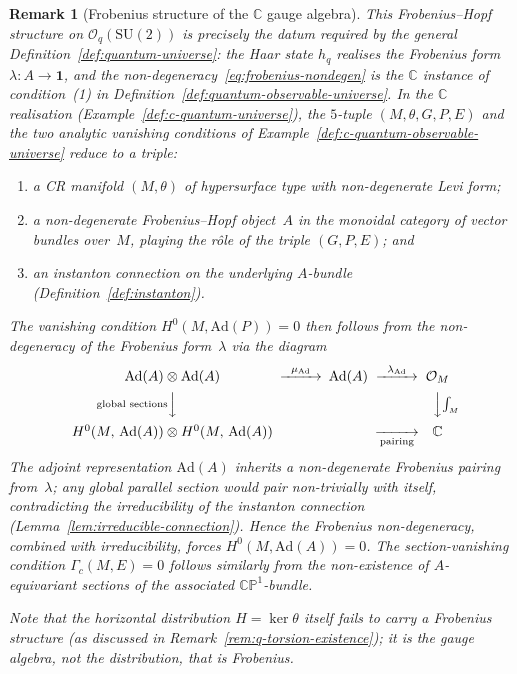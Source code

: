 \documentclass[12pt,a4paper]{report}
\newtheorem{remark}[theorem]{Remark}
\begin{document}
\begin{remark}[Frobenius structure of the $\mathbb{C}$ gauge algebra]
This Frobenius--Hopf structure on $\mathcal{O}_q(\mathrm{SU}(2))$ is
precisely the datum required by the general
Definition~\ref{def:quantum-universe}: the Haar state $h_q$ realises
the Frobenius form $\lambda \colon A \to \mathbf{1}$, and the
non-degeneracy~\eqref{eq:frobenius-nondegen} is the $\mathbb{C}$
instance of condition~(1) in
Definition~\ref{def:quantum-observable-universe}.
In the $\mathbb{C}$ realisation (Example~\ref{def:c-quantum-universe}),
the $5$-tuple $(M, \theta, G, P, E)$ and the two analytic vanishing
conditions of Example~\ref{def:c-quantum-observable-universe}
reduce to a triple:
\begin{enumerate}
  \item a CR manifold $(M, \theta)$ of hypersurface type with
        non-degenerate Levi form;
  \item a non-degenerate Frobenius--Hopf object~$A$ in the monoidal
        category of vector bundles over~$M$, playing the r\^ole of the
        triple $(G, P, E)$; and
  \item an instanton connection on the underlying $A$-bundle
        (Definition~\ref{def:instanton}).
\end{enumerate}
The vanishing condition $H^0(M, \mathrm{Ad}(P)) = 0$ then follows from
the non-degeneracy of the Frobenius form~$\lambda$ via the diagram
\begin{equation}\label{eq:frobenius-vanishing}
\begin{CD}
\mathrm{Ad}(A) \otimes \mathrm{Ad}(A)
  @>{\mu_{\mathrm{Ad}}}>>
  \mathrm{Ad}(A)
  @>{\lambda_{\mathrm{Ad}}}>>
  \mathcal{O}_M \\
@V{\text{global sections}}VV  @.  @VV{\int_M}V \\
H^0(M,\,\mathrm{Ad}(A)) \otimes H^0(M,\,\mathrm{Ad}(A))
  @.  @>>{\text{pairing}}>
  \mathbb{C}
\end{CD}
\end{equation}
The adjoint representation $\mathrm{Ad}(A)$ inherits a non-degenerate
Frobenius pairing from~$\lambda$; any global parallel section would
pair non-trivially with itself, contradicting the irreducibility of
the instanton connection
(Lemma~\ref{lem:irreducible-connection}).  Hence the Frobenius
non-degeneracy, combined with irreducibility, forces
$H^0(M, \mathrm{Ad}(A)) = 0$.  The section-vanishing condition
$\Gamma_c(M, E) = 0$ follows similarly from the non-existence of
$A$-equivariant sections of the associated $\mathbb{CP}^1$-bundle.

Note that the horizontal distribution $H = \ker\theta$ itself
\emph{fails} to carry a Frobenius structure (as discussed in
Remark~\ref{rem:q-torsion-existence}); it is the gauge algebra, not the
distribution, that is Frobenius.
\end{remark}
\end{document}
